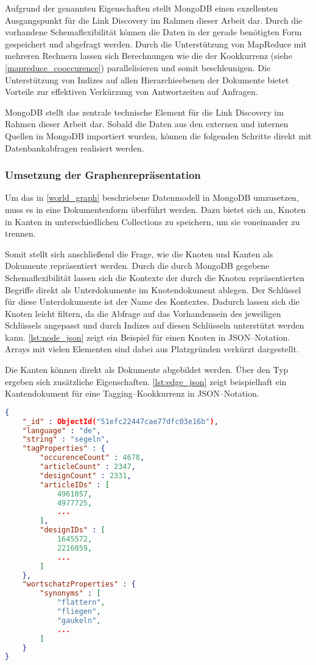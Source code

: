 Aufgrund der genannten Eigenschaften stellt MongoDB einen exzellenten Ausgangspunkt für die Link Discovery im Rahmen dieser Arbeit dar. Durch die vorhandene Schemaflexibilität können die Daten in der gerade benötigten Form gespeichert und abgefragt werden. Durch die Unterstützung von MapReduce mit mehreren Rechnern lassen sich Berechnungen wie die der Kookkurrenz (siehe \cref{mapreduce_cooccurence}) parallelisieren und somit beschleunigen. Die Unterstützung von Indizes auf allen Hierarchieebenen der Dokumente bietet Vorteile zur effektiven Verkürzung von Antwortzeiten auf Anfragen.

MongoDB stellt das zentrale technische Element für die Link Discovery im Rahmen dieser Arbeit dar. Sobald die Daten aus den externen und internen Quellen in MongoDB importiert wurden, können die folgenden Schritte direkt mit Datenbankabfragen realisiert werden.

\subsubsection{Umsetzung der Graphenrepräsentation}

Um das in \cref{world_graph} beschriebene Datenmodell in MongoDB umzusetzen, muss es in eine Dokumentenform überführt werden. Dazu bietet sich an, Knoten in Kanten in unterschiedlichen Collections zu speichern, um sie voneinander zu trennen.

Somit stellt sich anschließend die Frage, wie die Knoten und Kanten als Dokumente repräsentiert werden. Durch die durch MongoDB gegebene Schemaflexibilität lassen sich die Kontexte der durch die Knoten repräsentierten Begriffe direkt als Unterdokumente im Knotendokument ablegen. Der Schlüssel für diese Unterdokumente ist der Name des Kontextes. Dadurch lassen sich die Knoten leicht filtern, da die Abfrage auf das Vorhandensein des jeweiligen Schlüssels angepasst und durch Indizes auf diesen Schlüsseln unterstützt werden kann. \cref{lst:node_json} zeigt ein Beispiel für einen Knoten in JSON--Notation. Arrays mit vielen Elementen sind dabei aus Platzgründen verkürzt dargestellt.

Die Kanten können direkt als Dokumente abgebildet werden. Über den Typ ergeben sich zusätzliche Eigenschaften. \cref{lst:edge_json} zeigt beispielhaft ein Kantendokument für eine Tagging--Kookkurrenz in JSON--Notation.

\begin{lstlisting}[language=json, label={lst:node_json}, caption={JSON--Beispiel für ein Knotendokument in MongoDB}, float]
{
    "_id" : ObjectId("51efc22447cae77dfc03e16b"),
    "language" : "de",
    "string" : "segeln",
    "tagProperties" : {
        "occurenceCount" : 4678,
        "articleCount" : 2347,
        "designCount" : 2331,
        "articleIDs" : [ 
            4961057, 
            4977725, 
            ...
        ],
        "designIDs" : [ 
            1645572, 
            2216059, 
            ...
        ]
    },
    "wortschatzProperties" : {
        "synonyms" : [ 
            "flattern", 
            "fliegen", 
            "gaukeln", 
            ...
        ]
    }
}
\end{lstlisting}

